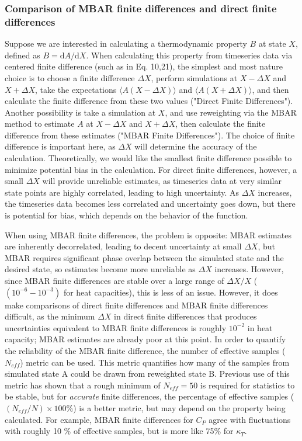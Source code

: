 \documentclass[aps,pre,twocolumn,nofootinbib,superscriptaddress,linenumbers,10pt, draft,tightenlines]{revtex4-1}
\begin{document}
\subsubsection{Comparison of MBAR finite differences and direct finite differences}
Suppose we are interested in calculating a thermodynamic property $B$ at state $X$, defined as $B=\mathrm{d}A/\mathrm{d}X$.
When calculating this property from timeseries data via centered finite difference (such as in Eq. 10,21), the simplest and most nature choice is to choose a finite difference $\Delta X$, perform simulations at $X-\Delta X$ and $X+\Delta X$, take the expectations $\langle A(X-\Delta X) \rangle$ and $\langle A(X+\Delta X)\rangle $, and then calculate the finite difference from these two values ("Direct Finite Differences").
  Another possibility is take a simulation at $X$, and use reweighting via the MBAR method \cite{MBAR} to estimate $A$ at $X-\Delta X$ and $X+\Delta X$, then calculate the finite difference from these estimates ("MBAR Finite Differences").  
The choice of finite difference is important here, as $\Delta X$ will determine the accuracy of the calculation. Theoretically, we would like the smallest finite difference possible to minimize potential bias in the calculation.  For direct finite differences, however, a small $\Delta X $ will provide unreliable estimates, as timeseries data at very similar state points are highly correlated, leading to high uncertainty.  As $ \Delta X $ increases, the timeseries data becomes less correlated and uncertainty goes down, but there is potential for bias, which depends on the behavior of the function.

When using MBAR finite differences, the problem is opposite: MBAR estimates are inherently decorrelated, leading to decent uncertainty at small $\Delta X$, but MBAR requires significant phase overlap between the simulated state and the desired state, so estimates become more unreliable as $\Delta X$ increases. However, since MBAR finite differences are stable over a large range of $\Delta X/X$ ($(10^{-6}-10^{-3})$ for heat capacities), this is less of an issue. However, it does make comparisons of direct finite differences and MBAR finite differences difficult, as the minimum $\Delta X$ in direct finite differences that produces uncertainties equivalent to MBAR finite differences is roughly $10^{-2}$ in heat capacity; MBAR estimates are already poor at this point.  In order to quantify the reliability of the MBAR finite difference, the number of effective samples ($N_{eff}$) metric can be used.  This metric quantifies how many of the samples from simulated state A could be drawn from reweighted state B.  Previous use of this metric has shown that a rough minimum of $N_{eff}=50$ is required for statistics to be stable, but for \emph{accurate} finite differences, the percentage of effective samples ($(N_{eff}/N)\times 100 \% $) is a better metric, but may depend on the property being calculated.  For example, MBAR finite differences for $C_P$ agree with fluctuations with roughly 10 \% of effective samples, but is more like 75\% for $\kappa_T$.
\end{document}
